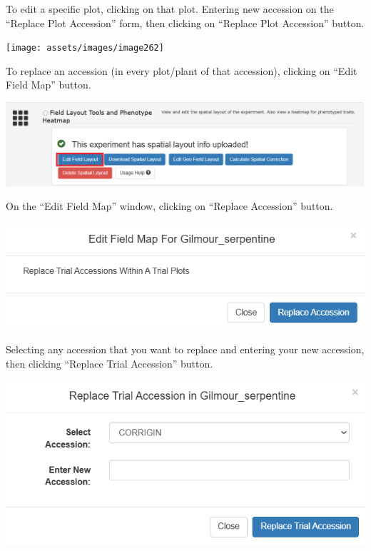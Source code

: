 \documentclass[
  12pt,
]{book}
\begin{document}
To edit a specific plot, clicking on that plot. Entering new accession on the ``Replace Plot Accession'' form, then clicking on ``Replace Plot Accession'' button.

\begin{center}\texttt{[image: assets/images/image262]} \end{center}

To replace an accession (in every plot/plant of that accession), clicking on ``Edit Field Map'' button.

\begin{center}\includegraphics[width=0.95\linewidth]{assets/images/image173} \end{center}

On the ``Edit Field Map'' window, clicking on ``Replace Accession'' button.

\begin{center}\includegraphics[width=0.95\linewidth]{assets/images/image87} \end{center}

Selecting any accession that you want to replace and entering your new accession, then clicking ``Replace Trial Accession'' button.

\begin{center}\includegraphics[width=0.95\linewidth]{assets/images/image85} \end{center}
\end{document}
